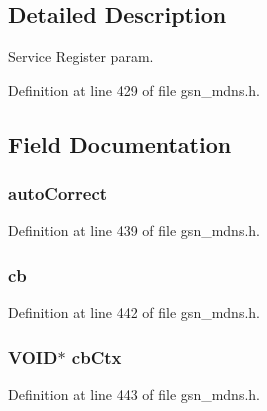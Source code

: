 \subsection{Detailed Description}
Service Register param. 

Definition at line 429 of file gsn\_\-mdns.h.



\subsection{Field Documentation}
\hypertarget{a00149_a6922e2bbd8ef32a53abd5bbf5e2b40a1}{
\subsubsection[{autoCorrect}]{ {\bf autoCorrect}}}
\label{a00149_a6922e2bbd8ef32a53abd5bbf5e2b40a1}


Definition at line 439 of file gsn\_\-mdns.h.

\hypertarget{a00149_a9537e3f5198ad7dff4aeecabdc552166}{
\subsubsection[{cb}]{ {\bf cb}}}
\label{a00149_a9537e3f5198ad7dff4aeecabdc552166}


Definition at line 442 of file gsn\_\-mdns.h.

\hypertarget{a00149_abc1717c5357c7dda5c2abef096a06f1f}{
\subsubsection[{cbCtx}]{\setlength{\rightskip}{0pt plus 5cm}VOID$\ast$ {\bf cbCtx}}}
\label{a00149_abc1717c5357c7dda5c2abef096a06f1f}


Definition at line 443 of file gsn\_\-mdns.h.

